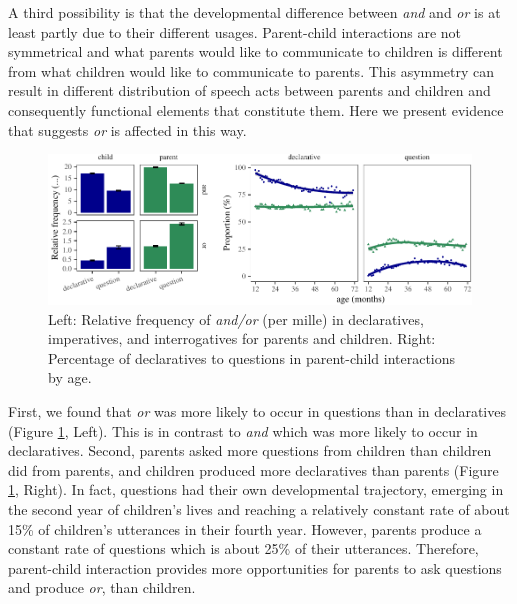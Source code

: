 \documentclass[,man,floatsintext]{apa6}
\begin{document}
A third possibility is that the developmental difference between \emph{and} and \emph{or} is at least partly due to their different usages. Parent-child interactions are not symmetrical and what parents would like to communicate to children is different from what children would like to communicate to parents. This asymmetry can result in different distribution of speech acts between parents and children and consequently functional elements that constitute them. Here we present evidence that suggests \emph{or} is affected in this way.

\begin{figure}[tb]

{\centering \includegraphics{figs/speechActPlots-1} 

}

\caption{Left: Relative frequency of \textit{and/or} (per mille) in declaratives, imperatives, and interrogatives for parents and children. Right: Percentage of declaratives to questions in parent-child interactions by age.}\label{fig:speechActPlots}
\end{figure}

First, we found that \emph{or} was more likely to occur in questions than in declaratives (Figure \ref{fig:speechActPlots}, Left). This is in contrast to \emph{and} which was more likely to occur in declaratives. Second, parents asked more questions from children than children did from parents, and children produced more declaratives than parents (Figure \ref{fig:speechActPlots}, Right). In fact, questions had their own developmental trajectory, emerging in the second year of children's lives and reaching a relatively constant rate of about 15\% of children's utterances in their fourth year. However, parents produce a constant rate of questions which is about 25\% of their utterances. Therefore, parent-child interaction provides more opportunities for parents to ask questions and produce \emph{or}, than children.
\end{document}
